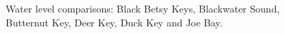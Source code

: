 \begin{figure}[H]
  \caption{Water level comparisons: Black Betsy Keys, Blackwater Sound, Butternut Key, Deer Key, Duck Key and Joe Bay.}
  \label{fig:Stage compare 1}
\end{figure}

